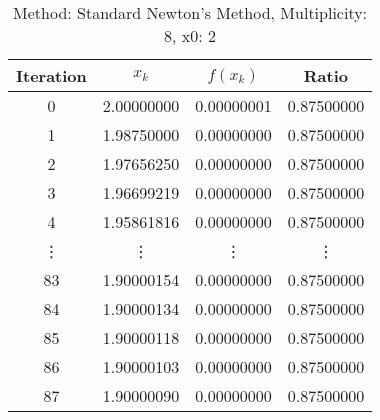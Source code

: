 \begin{table}
\centering
\caption{Method: Standard Newton's Method, Multiplicity: 8, x0: 2}
\label{tab:table_Standard_Newton's_Method_8_2}
\begin{tabular}{c c c c}
\toprule
Iteration &      $x_k$ &   $f(x_k)$ &      Ratio \\
\midrule
        0 & 2.00000000 & 0.00000001 & 0.87500000 \\
        1 & 1.98750000 & 0.00000000 & 0.87500000 \\
        2 & 1.97656250 & 0.00000000 & 0.87500000 \\
        3 & 1.96699219 & 0.00000000 & 0.87500000 \\
        4 & 1.95861816 & 0.00000000 & 0.87500000 \\
   \vdots &     \vdots &     \vdots &     \vdots \\
       83 & 1.90000154 & 0.00000000 & 0.87500000 \\
       84 & 1.90000134 & 0.00000000 & 0.87500000 \\
       85 & 1.90000118 & 0.00000000 & 0.87500000 \\
       86 & 1.90000103 & 0.00000000 & 0.87500000 \\
       87 & 1.90000090 & 0.00000000 & 0.87500000 \\
\bottomrule
\end{tabular}
\end{table}
